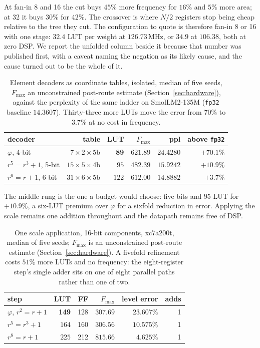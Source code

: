 \documentclass[11pt]{article}
\theoremstyle{definition}
\begin{document}
At fan-in 8 and 16 the cut buys $45\%$ more frequency for $16\%$ and $5\%$ more
area; at 32 it buys $30\%$ for $42\%$. The crossover is where $N/2$ registers
stop being cheap relative to the tree they cut. The configuration to quote is
therefore fan-in 8 or 16 with one stage: $32.4$ LUT per weight at $126.73$\,MHz,
or $34.9$ at $106.38$, both at zero DSP. We report the unfolded column beside it because that number was
published first, with a caveat naming the negation as its likely cause, and the
cause turned out to be the whole of it.

\begin{table}[t]\centering
\caption{Element decoders as coordinate tables, isolated, median of five seeds,
$F_{\max}$ an unconstrained post-route estimate (Section~\ref{sec:hardware}),
against the perplexity of the same ladder on SmolLM2-135M
(\texttt{fp32} baseline $14.3607$). Thirty-three more LUTs move the error from
$70\%$ to $3.7\%$ at no cost in frequency.}
\label{tab:elemsil}
\begin{tabular}{lrrrrr}
\toprule
decoder & table & LUT & $F_{\max}$ & ppl & above \texttt{fp32} \\
\midrule
$\varphi$, 4-bit          & $7\times2\times5$b  & \textbf{89} & $621.89$ & $24.4280$ & $+70.1\%$ \\
$r^5{=}r^3{+}1$, 5-bit    & $15\times5\times4$b & $95$ & $482.39$ & $15.9242$ & $+10.9\%$ \\
$r^6{=}r{+}1$, 6-bit      & $31\times6\times5$b & $122$ & $612.00$ & $\mathbf{14.8882}$ & $\mathbf{+3.7\%}$ \\
\bottomrule
\end{tabular}
\end{table}

The middle rung is the one a budget would choose: five bits and $95$ LUT for
$+10.9\%$, a six-LUT premium over $\varphi$ for a sixfold reduction in error.
Applying the scale remains one addition throughout and the datapath remains free
of DSP.

\begin{table}[t]\centering
\caption{One scale application, 16-bit components, xc7a200t, median of five
seeds; $F_{\max}$ is an unconstrained post-route estimate
(Section~\ref{sec:hardware}). A fivefold refinement costs $51\%$ more LUTs and no frequency: the
eight-register step's single adder sits on one of eight parallel paths rather
than one of two.}
\label{tab:oneadder}
\begin{tabular}{lrrrrr}
\toprule
step & LUT & FF & $F_{\max}$ & level error & adds \\
\midrule
$\varphi$, $r^2=r+1$   & \textbf{149} & 128 & $307.69$ & $23.607\%$ & 1 \\
$r^5=r^3+1$            & $164$ & 160 & $306.56$ & $10.575\%$ & 1 \\
$r^8=r+1$              & $225$ & 212 & $\mathbf{815.66}$ & $\mathbf{4.625\%}$ & 1 \\
\bottomrule
\end{tabular}
\end{table}
\end{document}
